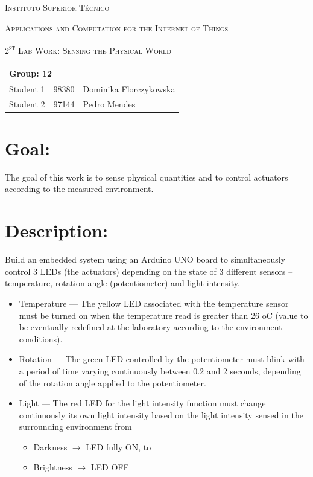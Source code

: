 \documentclass[10pt]{article}
\begin{document}
\begin{center}
    {\scshape Instituto Superior Técnico\par}
    \vspace{1cm}
    {\scshape\Large Applications and Computation for the Internet of Things\par}
    \vspace{1.5cm}
\end{center}
{\scshape\LARGE 2\textsuperscript{st} Lab Work: Sensing the Physical World}
\\
\begin{table}[h!]
    \centering
    \begin{tabular}{|l|l|p{10cm}|}
        \hline
        \multicolumn{3}{|l|}{Group: 12} \\[1.5ex] \hline
        Student 1 & 98380 & Dominika Florczykowska \\ [1.5ex]\hline
        Student 2 & 97144 & Pedro Mendes \\ [1.5ex]\hline
    \end{tabular}
\end{table}

\section{Goal:}
The goal of this work is to sense physical quantities and to control actuators according to the measured environment.

\section{Description:}
Build an embedded system using an Arduino UNO board to simultaneously control 3
LEDs (the actuators) depending on the state of 3 different sensors –
temperature, rotation angle (potentiometer) and light intensity.

\begin{itemize}
    \item Temperature --- The yellow LED associated with the temperature sensor
        must be turned on when the temperature read is greater than 26 oC (value
        to be eventually redefined at the laboratory according to the
        environment conditions).
    \item Rotation --- The green LED controlled by the potentiometer must blink
        with a period of time varying continuously between 0.2 and 2 seconds,
        depending of the rotation angle applied to the potentiometer.
    \item Light --- The red LED for the light intensity function must change
        continuously its own light intensity based on the light intensity sensed
        in the surrounding environment from
        \begin{itemize}
            \item Darkness $\rightarrow$ LED fully ON, to
            \item Brightness $\rightarrow$ LED OFF
        \end{itemize}
\end{itemize}
\end{document}
